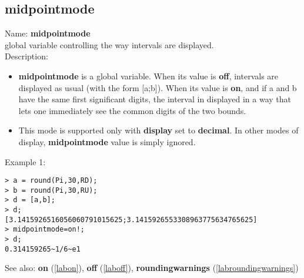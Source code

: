 \subsection{midpointmode}
\label{labmidpointmode}
\noindent Name: \textbf{midpointmode}\\
global variable controlling the way intervals are displayed.\\

\noindent Description: \begin{itemize}

\item \textbf{midpointmode} is a global variable. When its value is \textbf{off}, intervals are displayed
   as usual (with the form [a;b]).
   When its value is \textbf{on}, and if a and b have the same first significant digits,
   the interval in displayed in a way that lets one immediately see the common
   digits of the two bounds.

\item This mode is supported only with \textbf{display} set to \textbf{decimal}. In other modes of 
   display, \textbf{midpointmode} value is simply ignored.
\end{itemize}
\noindent Example 1: 
\begin{center}\begin{minipage}{15cm}\begin{Verbatim}[frame=single]
> a = round(Pi,30,RD);
> b = round(Pi,30,RU);
> d = [a,b];
> d;
[3.1415926516056060791015625;3.1415926553308963775634765625]
> midpointmode=on!;
> d;
0.314159265~1/6~e1
\end{Verbatim}
\end{minipage}\end{center}
See also: \textbf{on} (\ref{labon}), \textbf{off} (\ref{laboff}), \textbf{roundingwarnings} (\ref{labroundingwarnings})
